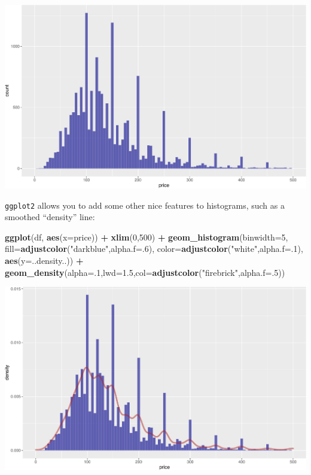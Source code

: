 \documentclass[
]{book}
\newenvironment{Shaded}{\begin{snugshade}}{\end{snugshade}}
\newcommand{\DataTypeTok}[1]{\textcolor[rgb]{0.13,0.29,0.53}{#1}}
\newcommand{\DecValTok}[1]{\textcolor[rgb]{0.00,0.00,0.81}{#1}}
\newcommand{\FloatTok}[1]{\textcolor[rgb]{0.00,0.00,0.81}{#1}}
\newcommand{\KeywordTok}[1]{\textcolor[rgb]{0.13,0.29,0.53}{\textbf{#1}}}
\newcommand{\NormalTok}[1]{#1}
\newcommand{\OperatorTok}[1]{\textcolor[rgb]{0.81,0.36,0.00}{\textbf{#1}}}
\newcommand{\StringTok}[1]{\textcolor[rgb]{0.31,0.60,0.02}{#1}}
\begin{document}
\includegraphics{figures/unnamed-chunk-217-1.pdf}

\texttt{ggplot2} allows you to add some other nice features to histograms, such as a smoothed ``density'' line:

\begin{Shaded}
\begin{Highlighting}[]
\KeywordTok{ggplot}\NormalTok{(df, }\KeywordTok{aes}\NormalTok{(}\DataTypeTok{x=}\NormalTok{price)) }\OperatorTok{+}\StringTok{ }
\StringTok{  }\KeywordTok{xlim}\NormalTok{(}\DecValTok{0}\NormalTok{,}\DecValTok{500}\NormalTok{) }\OperatorTok{+}
\StringTok{  }\KeywordTok{geom_histogram}\NormalTok{(}\DataTypeTok{binwidth=}\DecValTok{5}\NormalTok{,}
                 \DataTypeTok{fill=}\KeywordTok{adjustcolor}\NormalTok{(}\StringTok{"darkblue"}\NormalTok{,}\DataTypeTok{alpha.f=}\NormalTok{.}\DecValTok{6}\NormalTok{),}
                 \DataTypeTok{color=}\KeywordTok{adjustcolor}\NormalTok{(}\StringTok{"white"}\NormalTok{,}\DataTypeTok{alpha.f=}\NormalTok{.}\DecValTok{1}\NormalTok{),}
                 \KeywordTok{aes}\NormalTok{(}\DataTypeTok{y=}\NormalTok{..density..)) }\OperatorTok{+}
\StringTok{  }\KeywordTok{geom_density}\NormalTok{(}\DataTypeTok{alpha=}\NormalTok{.}\DecValTok{1}\NormalTok{,}\DataTypeTok{lwd=}\FloatTok{1.5}\NormalTok{,}\DataTypeTok{col=}\KeywordTok{adjustcolor}\NormalTok{(}\StringTok{"firebrick"}\NormalTok{,}\DataTypeTok{alpha.f=}\NormalTok{.}\DecValTok{5}\NormalTok{))}
\end{Highlighting}
\end{Shaded}

\includegraphics{figures/unnamed-chunk-218-1.pdf}
\end{document}
